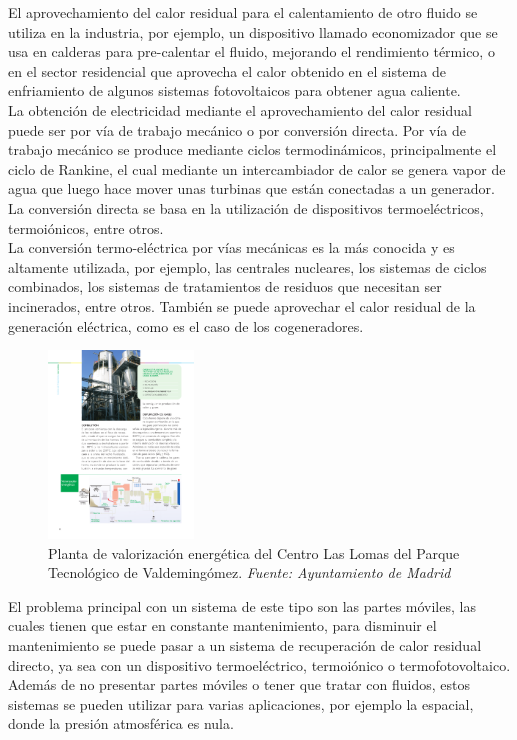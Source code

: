 El aprovechamiento del calor residual para el calentamiento de otro fluido se utiliza en la industria, por ejemplo, un dispositivo llamado economizador que se usa en calderas para pre-calentar el fluido, mejorando el rendimiento térmico, o en el sector residencial que aprovecha el calor obtenido en el sistema de enfriamiento de algunos sistemas fotovoltaicos para obtener agua caliente.\\ 

La obtención de electricidad mediante el aprovechamiento del calor residual puede ser por vía de trabajo mecánico o por conversión directa. Por vía de trabajo mecánico se produce mediante ciclos termodinámicos, principalmente el ciclo de Rankine, el cual mediante un intercambiador de calor se genera vapor de agua que luego hace mover unas turbinas que están conectadas a un generador. La conversión directa se basa en la utilización de dispositivos termoeléctricos, termoiónicos, entre otros.\\

La conversión termo-eléctrica por vías mecánicas es la más conocida y es altamente utilizada, por ejemplo, las centrales nucleares, los sistemas de ciclos combinados, los sistemas de tratamientos de residuos que necesitan ser incinerados, entre otros. También se puede aprovechar el calor residual de la generación eléctrica, como es el caso de los cogeneradores.

\begin{figure}[H]
	\centering
	\includegraphics[height=5cm]{figuras/esquemasLomasValorizacion}
	\caption{Planta de valorización energética del Centro Las Lomas del Parque Tecnológico de Valdemingómez. \textit{Fuente: Ayuntamiento de Madrid}}
	\label{fig:esquemaslomasvalorizacion}
\end{figure}

El problema principal con un sistema de este tipo son las partes móviles, las cuales tienen que estar en constante mantenimiento, para disminuir el mantenimiento se puede pasar a un sistema de recuperación de calor residual directo, ya sea con un dispositivo termoeléctrico, termoiónico o termofotovoltaico. Además de no presentar partes móviles o tener que tratar con fluidos, estos sistemas se pueden utilizar para varias aplicaciones, por ejemplo la espacial, donde la presión atmosférica es nula.\\

